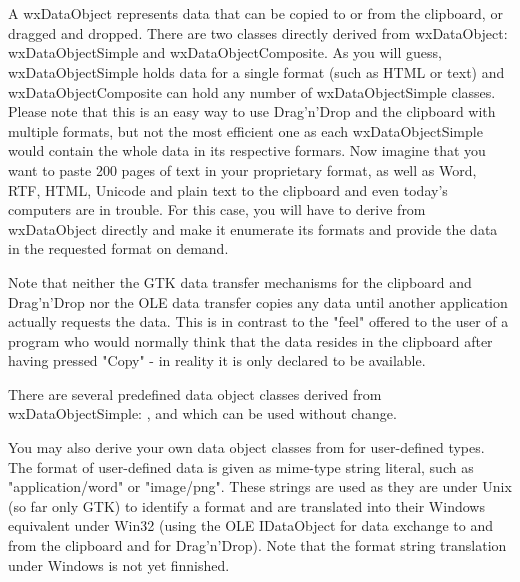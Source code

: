 \section{}\label{wxdataobject}

A wxDataObject represents data that can be copied to or from the clipboard, or
dragged and dropped. There are two classes directly derived from wxDataObject:
wxDataObjectSimple and wxDataObjectComposite. As you will guess, wxDataObjectSimple
holds data for a single format (such as HTML or text) and wxDataObjectComposite
can hold any number of wxDataObjectSimple classes. Please note that this is an
easy way to use Drag'n'Drop and the clipboard with multiple formats, but not the
most efficient one as each wxDataObjectSimple would contain the whole data in its
respective formars. Now imagine that you want to paste 200 pages of text in your
proprietary format, as well as Word, RTF, HTML, Unicode and plain text to the
clipboard and even today's computers are in trouble. For this case, you will have
to derive from wxDataObject directly and make it enumerate its formats and provide
the data in the requested format on demand.

Note that neither the GTK data transfer mechanisms for the clipboard and Drag'n'Drop
nor the OLE data transfer copies any data until another application actually
requests the data. This is in contrast to the "feel" offered to the user of a
program who would normally think that the data resides in the clipboard after
having pressed "Copy" - in reality it is only declared to be available.

There are several predefined data object classes derived from wxDataObjectSimple:
,  
and  which can be used without change.

You may also derive your own data object classes from  
for user-defined types. The format of user-defined data is given as mime-type string literal, 
such as "application/word" or "image/png". These strings are used as they are under Unix (so 
far only GTK) to identify a format and are translated into their Windows equivalent under 
Win32 (using the OLE IDataObject for data exchange to and from the clipboard and for Drag'n'Drop).
Note that the format string translation under Windows is not yet finnished.


